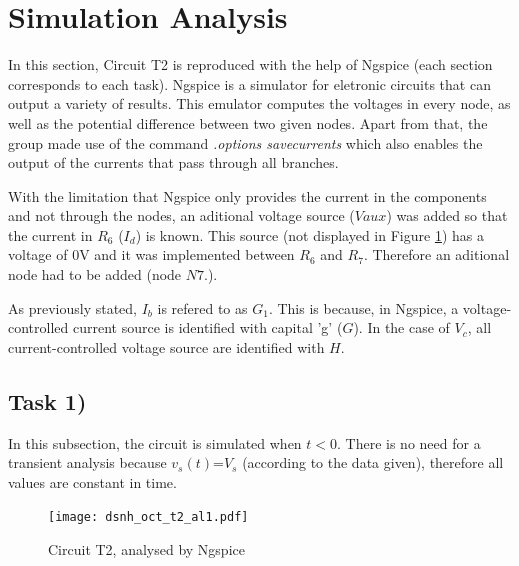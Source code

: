 \section{Simulation Analysis}
\label{sec:simulation}


In this section, Circuit T2 is reproduced with the help of Ngspice (each section corresponds
to each task). Ngspice is a simulator for eletronic circuits that can output a variety of results.
This emulator computes the voltages in every node, as well as the potential difference
between two given nodes. Apart from that, the group made use of the command
{\em .options savecurrents} which also enables the output of the currents that pass
through all branches.

With the limitation that Ngspice only provides the current in the components and not through
the nodes, an aditional voltage source ($Vaux$) was added so that the current in $R_6$ ($I_d$)
is known. This source (not displayed in Figure \ref{fig:Dsnh_sim_t2}) has a voltage of 0V and it 
was implemented between $R_6$ and $R_7$. Therefore an aditional node had to be added (node $N7.$).

As previously stated, $I_b$ is refered to as $G_1$. This is because, in Ngspice, a
voltage-controlled current source is identified with capital 'g' ($G$). In the case of
$V_c$, all current-controlled voltage source are identified with $H$.


\subsection{Task 1)}
\label{subsec:task1_s}


In this subsection, the circuit is simulated when $t<0$. There is no need for a
transient analysis because $v_s(t)$=$V_s$ (according to the data given), therefore
all values are constant in time. 

\begin{figure}[ht]
	\centering
	\texttt{[image: dsnh\_oct\_t2\_al1.pdf]}
	\caption{Circuit T2, analysed by Ngspice}
\label{fig:Dsnh_sim_t2}
\end{figure}


